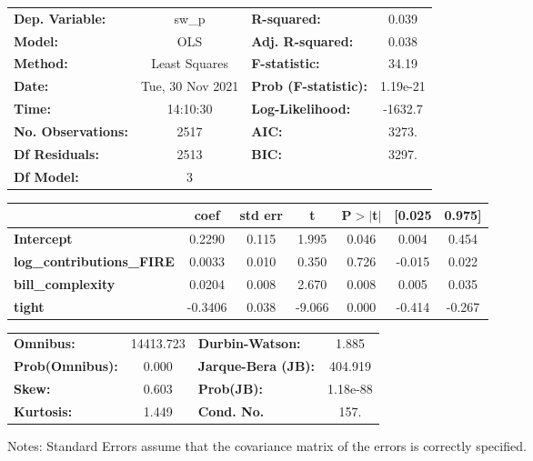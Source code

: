 \begin{center}
\begin{tabular}{lclc}
\toprule
\textbf{Dep. Variable:}           &      sw\_p       & \textbf{  R-squared:         } &     0.039   \\
\textbf{Model:}                   &       OLS        & \textbf{  Adj. R-squared:    } &     0.038   \\
\textbf{Method:}                  &  Least Squares   & \textbf{  F-statistic:       } &     34.19   \\
\textbf{Date:}                    & Tue, 30 Nov 2021 & \textbf{  Prob (F-statistic):} &  1.19e-21   \\
\textbf{Time:}                    &     14:10:30     & \textbf{  Log-Likelihood:    } &   -1632.7   \\
\textbf{No. Observations:}        &        2517      & \textbf{  AIC:               } &     3273.   \\
\textbf{Df Residuals:}            &        2513      & \textbf{  BIC:               } &     3297.   \\
\textbf{Df Model:}                &           3      & \textbf{                     } &             \\
\bottomrule
\end{tabular}
\begin{tabular}{lcccccc}
                                  & \textbf{coef} & \textbf{std err} & \textbf{t} & \textbf{P$> |$t$|$} & \textbf{[0.025} & \textbf{0.975]}  \\
\midrule
\textbf{Intercept}                &       0.2290  &        0.115     &     1.995  &         0.046        &        0.004    &        0.454     \\
\textbf{log\_contributions\_FIRE} &       0.0033  &        0.010     &     0.350  &         0.726        &       -0.015    &        0.022     \\
\textbf{bill\_complexity}         &       0.0204  &        0.008     &     2.670  &         0.008        &        0.005    &        0.035     \\
\textbf{tight}                    &      -0.3406  &        0.038     &    -9.066  &         0.000        &       -0.414    &       -0.267     \\
\bottomrule
\end{tabular}
\begin{tabular}{lclc}
\textbf{Omnibus:}       & 14413.723 & \textbf{  Durbin-Watson:     } &    1.885  \\
\textbf{Prob(Omnibus):} &    0.000  & \textbf{  Jarque-Bera (JB):  } &  404.919  \\
\textbf{Skew:}          &    0.603  & \textbf{  Prob(JB):          } & 1.18e-88  \\
\textbf{Kurtosis:}      &    1.449  & \textbf{  Cond. No.          } &     157.  \\
\bottomrule
\end{tabular}
\end{center}

Notes: \newline
 [1] Standard Errors assume that the covariance matrix of the errors is correctly specified.